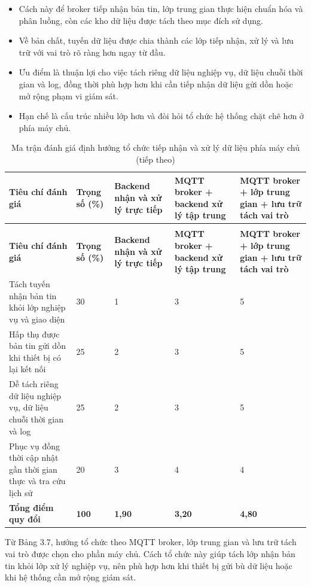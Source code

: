 \documentclass[a4paper]{extarticle}
\newcommand{\thesissettableid}[2]{%
  \renewcommand{\thetable}{#1}%
  \renewcommand{\theHtable}{#2}%
}
\providecommand{\tightlist}{%
  \setlength{\itemsep}{0pt}\setlength{\parskip}{0pt}}
\begin{document}
\begin{itemize}
  \begin{itemize}
  \tightlist
  \item
    Cách này để broker tiếp nhận bản tin, lớp trung gian thực hiện chuẩn hóa và phân luồng, còn các kho dữ liệu được tách theo mục đích sử dụng.
  \item
    Về bản chất, tuyến dữ liệu được chia thành các lớp tiếp nhận, xử lý và lưu trữ với vai trò rõ ràng hơn ngay từ đầu.
  \item
    Ưu điểm là thuận lợi cho việc tách riêng dữ liệu nghiệp vụ, dữ liệu chuỗi thời gian và log, đồng thời phù hợp hơn khi cần tiếp nhận dữ liệu gửi dồn hoặc mở rộng phạm vi giám sát.
  \item
    Hạn chế là cấu trúc nhiều lớp hơn và đòi hỏi tổ chức hệ thống chặt chẽ hơn ở phía máy chủ.
  \end{itemize}
\end{itemize}

{\thesissettableid{3.7}{condensed-r2-bang-3-7-ma-tran-danh-gia-dinh-huong-to-chuc-tiep-nhan-va-xu-ly-du-lieu-phia-may-chu}
\def\LTcaptype{table}
\begin{longtable}{|L{(\linewidth - 8\tabcolsep) * }|L{(\linewidth - 8\tabcolsep) * }|L{(\linewidth - 8\tabcolsep) * }|L{(\linewidth - 8\tabcolsep) * }|L{(\linewidth - 8\tabcolsep) * }|}
\caption{Ma trận đánh giá định hướng tổ chức tiếp nhận và xử lý dữ liệu phía máy chủ}\label{tab:condensed-r2-bang-3-7-ma-tran-danh-gia-dinh-huong-to-chuc-tiep-nhan-va-xu-ly-du-lieu-phia-may-chu}\\
\hline
\textbf{Tiêu chí đánh giá} & \textbf{Trọng số (\%)} & \textbf{Backend nhận và xử lý trực tiếp} & \textbf{MQTT broker + backend xử lý tập trung} & \textbf{MQTT broker + lớp trung gian + lưu trữ tách vai trò} \\
\hline
\endfirsthead
\caption[]{Ma trận đánh giá định hướng tổ chức tiếp nhận và xử lý dữ liệu phía máy chủ (tiếp theo)}\\
\hline
\textbf{Tiêu chí đánh giá} & \textbf{Trọng số (\%)} & \textbf{Backend nhận và xử lý trực tiếp} & \textbf{MQTT broker + backend xử lý tập trung} & \textbf{MQTT broker + lớp trung gian + lưu trữ tách vai trò} \\
\hline
\endhead
\endfoot
\endlastfoot
Tách tuyến nhận bản tin khỏi lớp nghiệp vụ và giao diện & 30 & 1 & 3 & 5 \\\hline
Hấp thụ được bản tin gửi dồn khi thiết bị có lại kết nối & 25 & 2 & 3 & 5 \\\hline
Dễ tách riêng dữ liệu nghiệp vụ, dữ liệu chuỗi thời gian và log & 25 & 2 & 3 & 5 \\\hline
Phục vụ đồng thời cập nhật gần thời gian thực và tra cứu lịch sử & 20 & 3 & 4 & 4 \\\hline
\textbf{Tổng điểm quy đổi} & \textbf{100} & \textbf{1,90} & \textbf{3,20} & \textbf{4,80} \\\hline
\end{longtable}
}
Từ Bảng 3.7, hướng tổ chức theo MQTT broker, lớp trung gian và lưu trữ tách vai trò được chọn cho phần máy chủ. Cách tổ chức này giúp tách lớp nhận bản tin khỏi lớp xử lý nghiệp vụ, nên phù hợp hơn khi thiết bị gửi bù dữ liệu hoặc khi hệ thống cần mở rộng giám sát.
\end{document}

